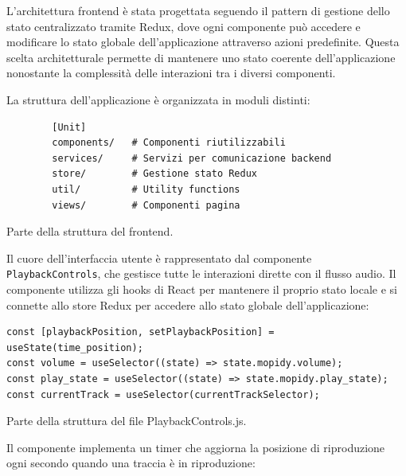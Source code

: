 L'architettura frontend è stata progettata seguendo il pattern di gestione dello stato centralizzato tramite Redux, dove ogni componente può accedere e modificare lo stato globale dell'applicazione attraverso azioni predefinite. Questa scelta architetturale permette di mantenere uno stato coerente dell'applicazione nonostante la complessità delle interazioni tra i diversi componenti.

La struttura dell'applicazione è organizzata in moduli distinti:

\begin{table}[H]
  \begin{algorithm}[H]
    \caption{}
    \BlankLine
      \begin{verbatim}
        [Unit]
        components/   # Componenti riutilizzabili
        services/     # Servizi per comunicazione backend
        store/        # Gestione stato Redux
        util/         # Utility functions
        views/        # Componenti pagina
      \end{verbatim}
    \end{algorithm}
    \caption{Parte della struttura del frontend.}
    \label{tab:frontend_struttura}
  \end{table}

Il cuore dell'interfaccia utente è rappresentato dal componente \texttt{PlaybackControls}, che gestisce tutte le interazioni dirette con il flusso audio. Il componente utilizza gli hooks di React per mantenere il proprio stato locale e si connette allo store Redux per accedere allo stato globale dell'applicazione:

\begin{table}[H]
  \begin{algorithm}[H]
    \caption{}
    \BlankLine
      \begin{verbatim}
const [playbackPosition, setPlaybackPosition] = useState(time_position);
const volume = useSelector((state) => state.mopidy.volume);
const play_state = useSelector((state) => state.mopidy.play_state);
const currentTrack = useSelector(currentTrackSelector);
      \end{verbatim}
    \end{algorithm}
    \caption{Parte della struttura del file PlaybackControls.js.}
    \label{tab:playbackcontrols_js}
  \end{table}

\newpage
Il componente implementa un timer che aggiorna la posizione di riproduzione ogni secondo quando una traccia è in riproduzione:

